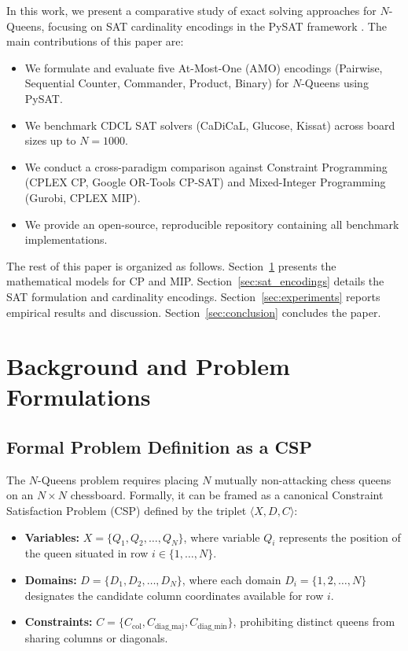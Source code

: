 \documentclass[a4paper,fleqn]{cas-sc}
\begin{document}
In this work, we present a comparative study of exact solving approaches for $N$-Queens, focusing on SAT cardinality encodings in the PySAT framework \cite{ignatiev2018pysat}. The main contributions of this paper are:
\begin{itemize}
    \item We formulate and evaluate five At-Most-One (AMO) encodings (Pairwise, Sequential Counter, Commander, Product, Binary) for $N$-Queens using PySAT.
    \item We benchmark CDCL SAT solvers (CaDiCaL, Glucose, Kissat) across board sizes up to $N = 1000$.
    \item We conduct a cross-paradigm comparison against Constraint Programming (CPLEX CP, Google OR-Tools CP-SAT) and Mixed-Integer Programming (Gurobi, CPLEX MIP).
    \item We provide an open-source, reproducible repository containing all benchmark implementations.
\end{itemize}

The rest of this paper is organized as follows. Section~\ref{sec:background} presents the mathematical models for CP and MIP. Section~\ref{sec:sat_encodings} details the SAT formulation and cardinality encodings. Section~\ref{sec:experiments} reports empirical results and discussion. Section~\ref{sec:conclusion} concludes the paper.

\section{Background and Problem Formulations}
\label{sec:background}

\subsection{Formal Problem Definition as a CSP}
\label{subsec:csp_definition}
The $N$-Queens problem requires placing $N$ mutually non-attacking chess queens on an $N \times N$ chessboard. Formally, it can be framed as a canonical Constraint Satisfaction Problem (CSP) defined by the triplet $\langle X, D, C \rangle$:
\begin{itemize}
    \item \textbf{Variables:} $X = \{Q_1, Q_2, \dots, Q_N\}$, where variable $Q_i$ represents the position of the queen situated in row $i \in \{1, \dots, N\}$.
    \item \textbf{Domains:} $D = \{D_1, D_2, \dots, D_N\}$, where each domain $D_i = \{1, 2, \dots, N\}$ designates the candidate column coordinates available for row $i$.
    \item \textbf{Constraints:} $C = \{C_{\text{col}}, C_{\text{diag\_maj}}, C_{\text{diag\_min}}\}$, prohibiting distinct queens from sharing columns or diagonals.
\end{itemize}
\end{document}
